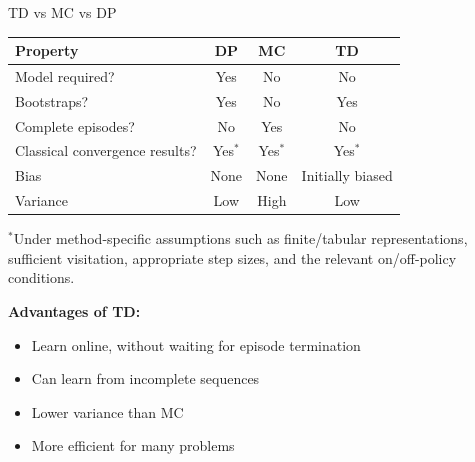 \documentclass[aspectratio=169]{beamer}
\begin{document}
\begin{frame}{TD vs MC vs DP}
  \begin{table}
    \centering
    \small
    \begin{tabular}{lccc}
      \toprule
      Property & DP & MC & TD \\
      \midrule
      Model required? & Yes & No & No \\
      Bootstraps? & Yes & No & Yes \\
      Complete episodes? & No & Yes & No \\
      Classical convergence results? & Yes$^*$ & Yes$^*$ & Yes$^*$ \\
      Bias & None & None & Initially biased \\
      Variance & Low & High & Low \\
      \bottomrule
    \end{tabular}
  \end{table}

  \vspace{0.5em}

  {\scriptsize $^*$Under method-specific assumptions such as finite/tabular representations, sufficient visitation, appropriate step sizes, and the relevant on/off-policy conditions.}\vspace{0.4em}

  \textbf{Advantages of TD:}
  \begin{itemize}
    \item Learn online, without waiting for episode termination
    \item Can learn from incomplete sequences
    \item Lower variance than MC
    \item More efficient for many problems
  \end{itemize}
\end{frame}
\end{document}
